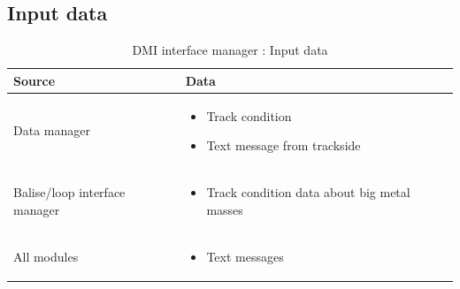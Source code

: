\documentclass[nocc]{template/openetcs_report}
\begin{document}
\subsection{Input data}
			\begin{longtable}{|l|l|}
				\caption{DMI interface manager : Input data}\\ 
				\hline
				
					\begin{minipage}[t]{0.35\linewidth} \textbf{Source}	\end{minipage} 
				&	\begin{minipage}[t]{0.65\linewidth} \textbf{Data} \end{minipage} \\
				
				\hline
																																									
					\begin{minipage}[t]{0.35\linewidth} Data manager	\end{minipage} 
				&	\begin{minipage}[t]{0.65\linewidth}
						\begin{itemize}
							\item Track condition
							\item Text message from trackside
						\end{itemize}
					\end{minipage} \\
				
				\hline
				
					\begin{minipage}[t]{0.35\linewidth} Balise/loop interface manager\end{minipage} 
				&	\begin{minipage}[t]{0.65\linewidth}
						\begin{itemize}
							\item Track condition data about big metal masses
						\end{itemize}			
					\end{minipage} \\
				
				\hline
					
					\begin{minipage}[t]{0.35\linewidth} All modules\end{minipage} 
				&	\begin{minipage}[t]{0.65\linewidth}
						\begin{itemize}
							\item Text messages
						\end{itemize}			
					\end{minipage} \\
				

\end{longtable}
\end{document}
